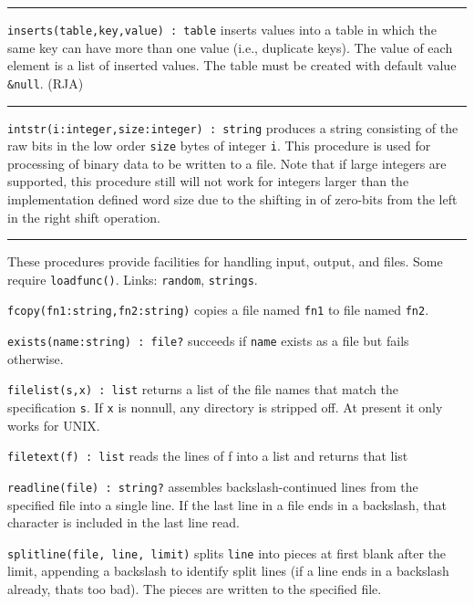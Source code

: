\vspace{0.25cm}\hrule{}

\texttt{inserts(table,key,value) : table} inserts values into a table in
which the same key can have more than one value (i.e.,
duplicate keys). The value of each element is a
list of inserted values. The table must be created with default value
\texttt{\&null}. (RJA)

\vspace{0.25cm}\hrule{}

\texttt{intstr(i:integer,size:integer) : string} produces a string
consisting of the raw bits in the low order \texttt{size} bytes of
integer \texttt{i}. This procedure is used for processing of
binary data to be written to a file. Note that if
large integers are supported, this procedure still will not work for
integers larger than the implementation defined word size due to the
shifting in of zero-bits from the left in the right shift operation.


\vspace{0.25cm}\hrule{}

These procedures provide facilities for handling input,
output, and files. Some require
\texttt{loadfunc()}. Links: \texttt{random}, \texttt{strings}.

\texttt{fcopy(fn1:string,fn2:string)} copies a file named \texttt{fn1}
to file named \texttt{fn2}.

\texttt{exists(name:string) : file?} succeeds if \texttt{name} exists as
a file but fails otherwise.

\texttt{filelist(s,x) : list} returns a list of the file names that
match the specification \texttt{s}. If \texttt{x} is nonnull, any
directory is stripped off. At present it only works for UNIX.

\texttt{filetext(f) : list} reads the lines of f into a list and returns
that list

\texttt{readline(file) : string?} assembles backslash-continued lines
from the specified file into a single line. If the last line in a file
ends in a backslash, that character is included in the last line read.

\texttt{splitline(file, line, limit)} splits \texttt{line} into pieces
at first blank after the limit, appending a backslash to identify split
lines (if a line ends in a backslash already, that{\textquotesingle}s
too bad). The pieces are written to the specified file.

